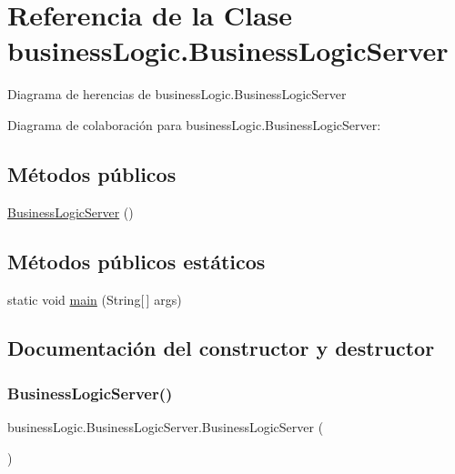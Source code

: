 \hypertarget{classbusiness_logic_1_1_business_logic_server}{}\section{Referencia de la Clase business\+Logic.\+Business\+Logic\+Server}
\label{classbusiness_logic_1_1_business_logic_server}


Diagrama de herencias de business\+Logic.\+Business\+Logic\+Server


Diagrama de colaboración para business\+Logic.\+Business\+Logic\+Server\+:
\subsection*{Métodos públicos}
\begin{DoxyCompactItemize}
\item 
\mbox{\hyperlink{classbusiness_logic_1_1_business_logic_server_a45e022d6b8b68567423caab4157e2784}{Business\+Logic\+Server}} ()
\end{DoxyCompactItemize}
\subsection*{Métodos públicos estáticos}
\begin{DoxyCompactItemize}
\item 
static void \mbox{\hyperlink{classbusiness_logic_1_1_business_logic_server_a978c1596ce77baed488f137fc96a4fe8}{main}} (String\mbox{[}$\,$\mbox{]} args)
\end{DoxyCompactItemize}


\subsection{Documentación del constructor y destructor}
\mbox{\label{classbusiness_logic_1_1_business_logic_server_a45e022d6b8b68567423caab4157e2784}} 
\subsubsection{\texorpdfstring{BusinessLogicServer()}{BusinessLogicServer()}}
{\footnotesize\ttfamily business\+Logic.\+Business\+Logic\+Server.\+Business\+Logic\+Server (\begin{DoxyParamCaption}{ }\end{DoxyParamCaption})}

